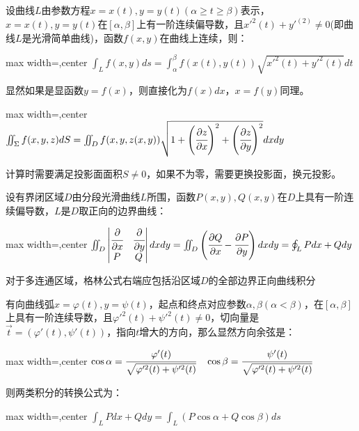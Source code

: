 \documentclass[twocolumn,10pt]{ctexart}
\begin{document}
设曲线$L$由参数方程$x=x(t),\allowbreak{}y=y(t)(\alpha\ge t\ge\beta)$表示，$x=x(t),y=y(t)$在$[\alpha,\beta]$上有一阶连续偏导数，且$x'^2(t)+y'^(2)\neq0$(即曲线$L$是光滑简单曲线)，函数$f(x,y)$在曲线上连续，则：

\begin{adjustbox}{max width=\linewidth,center}
$\int_Lf(x,y)ds=\int_\alpha^\beta f(x(t),y(t))\sqrt{x'^2(t)+y'^2(t)}dt$
\end{adjustbox}

显然如果是显函数$y=f(x)$，则直接化为$f(x)dx$，$x=f(y)$同理。

\begin{adjustbox}{max width=\linewidth,center}
$\iint_\Sigma f(x,y,z)dS=\iint_D f(x,y,z(x,y))\sqrt{1+\left(\cfrac{\partial z}{\partial x}\right)^2+\left(\cfrac{\partial z}{\partial y}\right)^2}dxdy$
\end{adjustbox}

计算时需要满足投影面面积$S\neq0$，如果不为零，需要更换投影面，换元投影。

设有界闭区域$D$由分段光滑曲线$L$所围，函数$P(x,y),Q(x,y)$在$D$上具有一阶连续偏导数，$L$是$D$取正向的边界曲线：

\begin{adjustbox}{max width=\linewidth,center}
$\iint_D\left|\begin{matrix}\cfrac{\partial}{\partial x}&\cfrac{\partial}{\partial y}\\P&Q\end{matrix}\right|dxdy=\iint_D\left(\cfrac{\partial Q}{\partial x}-\cfrac{\partial P}{\partial y}\right)dxdy=\oint_LPdx+Qdy$
\end{adjustbox}

对于多连通区域，格林公式右端应包括沿区域$D$的全部边界正向曲线积分

有向曲线弧$x=\varphi(t),y=\psi(t)$，起点和终点对应参数$\alpha,\beta(\alpha<\beta)$，在$[\alpha,\beta]$上具有一阶连续导数，且$\varphi'^2(t)+\psi'^2(t)\neq0$，切向量是$\vec t=(\varphi'(t),\psi'(t))$，指向$t$增大的方向，那么显然方向余弦是：

\begin{adjustbox}{max width=\linewidth,center}
$\cos\alpha=\cfrac{\varphi'(t)}{\sqrt{\varphi'^2(t)+\psi'^2(t)}}\quad\cos\beta=\cfrac{\psi'(t)}{\sqrt{\varphi'^2(t)+\psi'^2(t)}}$
\end{adjustbox}

则两类积分的转换公式为：

\begin{adjustbox}{max width=\linewidth,center}
$\int_LPdx+Qdy=\int_L(P\cos\alpha+Q\cos\beta)ds$
\end{adjustbox}
\end{document}
